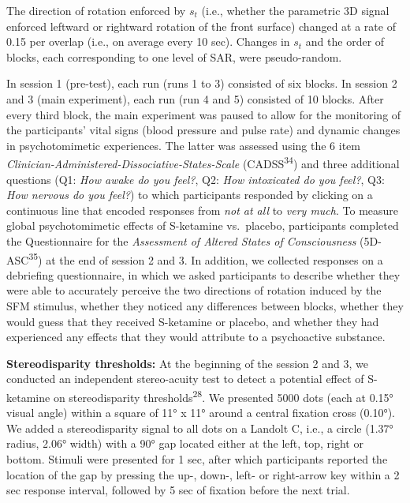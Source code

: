 \documentclass[
]{article}
\begin{document}
The direction of rotation enforced by \(s_t\) (i.e., whether the
parametric 3D signal enforced leftward or rightward rotation of the
front surface) changed at a rate of 0.15 per overlap (i.e., on average
every 10 sec). Changes in \(s_t\) and the order of blocks, each
corresponding to one level of SAR, were pseudo-random.

In session 1 (pre-test), each run (runs 1 to 3) consisted of six blocks.
In session 2 and 3 (main experiment), each run (run 4 and 5) consisted
of 10 blocks. After every third block, the main experiment was paused to
allow for the monitoring of the participants' vital signs (blood
pressure and pulse rate) and dynamic changes in psychotomimetic
experiences. The latter was assessed using the 6 item
\emph{Clinician-Administered-Dissociative-States-Scale}
(CADSS\textsuperscript{34}) and three additional questions (Q1:
\emph{How awake do you feel?}, Q2: \emph{How intoxicated do you feel?},
Q3: \emph{How nervous do you feel?}) to which participants responded by
clicking on a continuous line that encoded responses from \emph{not at
all} to \emph{very much}. To measure global psychotomimetic effects of
S-ketamine vs.~placebo, participants completed the Questionnaire for the
\emph{Assessment of Altered States of Consciousness}
(5D-ASC\textsuperscript{35}) at the end of session 2 and 3. In addition,
we collected responses on a debriefing questionnaire, in which we asked
participants to describe whether they were able to accurately perceive
the two directions of rotation induced by the SFM stimulus, whether they
noticed any differences between blocks, whether they would guess that
they received S-ketamine or placebo, and whether they had experienced
any effects that they would attribute to a psychoactive substance.

\textbf{Stereodisparity thresholds:} At the beginning of the session 2
and 3, we conducted an independent stereo-acuity test to detect a
potential effect of S-ketamine on stereodisparity
thresholds\textsuperscript{28}. We presented 5000 dots (each at 0.15°
visual angle) within a square of 11° x 11° around a central fixation
cross (0.10°). We added a stereodisparity signal to all dots on a
Landolt C, i.e., a circle (1.37° radius, 2.06° width) with a 90° gap
located either at the left, top, right or bottom. Stimuli were presented
for 1 sec, after which participants reported the location of the gap by
pressing the up-, down-, left- or right-arrow key within a 2 sec
response interval, followed by 5 sec of fixation before the next trial.
\end{document}
